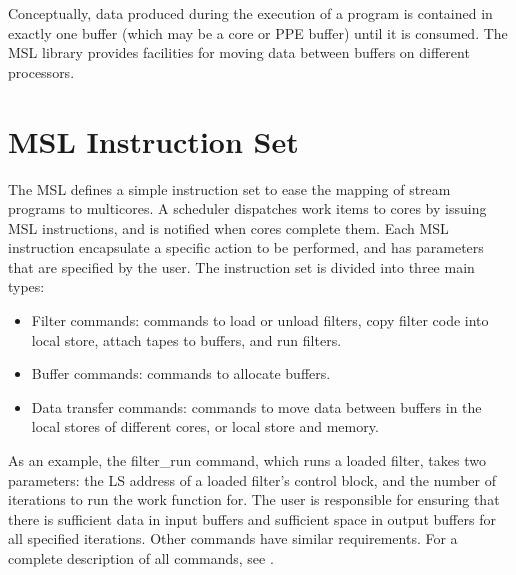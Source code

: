 


Conceptually, data produced during the execution of a program is
contained in exactly one buffer (which may be a core or PPE buffer)
until it is consumed. The MSL library provides facilities for moving
data between buffers on different processors.
 
\section{MSL Instruction Set}

The MSL defines a simple instruction set to ease the mapping of stream
programs to multicores. A scheduler dispatches work items to cores by
issuing MSL instructions, and is notified when cores complete
them. Each MSL instruction encapsulate a specific action to be
performed, and has parameters that are specified by the user. The
instruction set is divided into three main types:
\begin{itemize}
\item Filter commands: commands to load or unload filters, copy filter code into local store, attach tapes to buffers, and run filters.
\item Buffer commands: commands to allocate buffers.
\item Data transfer commands: commands to move data between buffers in the local stores of different cores, or local store and memory.
\end{itemize}

As an example, the \textsf{filter\_run} command, which runs a loaded
filter, takes two parameters: the LS address of a loaded filter's
control block, and the number of iterations to run the work function
for. The user is responsible for ensuring that there is sufficient
data in input buffers and sufficient space in output buffers for all
specified iterations. Other commands have similar requirements. For a
complete description of all commands, see \cite{dxzhang-meng-07}.

